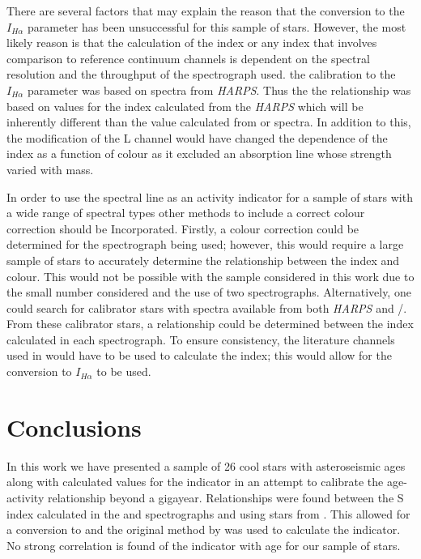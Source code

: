 There are several factors that may explain the reason that the conversion to the $I_{H\alpha}$ parameter has been unsuccessful for this sample of stars. However, the most likely reason is that the calculation of the \Halpha index or any index that involves comparison to reference continuum channels is dependent on the spectral resolution and the throughput of the spectrograph used. the calibration to the $I_{H\alpha}$ parameter was based on spectra from \textit{HARPS}. Thus the the relationship was based on values for the \Halpha index calculated from the \textit{HARPS} which will be inherently different than the value calculated from \esp or \narval spectra. In addition to this, the modification of the L channel would have changed the dependence of the \Halpha index as a function of colour as it excluded an absorption line whose strength varied with mass.

In order to use the \Halpha spectral line as an activity indicator for a sample of stars with a wide range of spectral types other methods to include a correct colour correction should be Incorporated. Firstly, a colour correction could be determined for the spectrograph being used; however, this would require a large sample of stars to accurately determine the relationship between the \Halpha index and colour. This would not be possible with the sample considered in this work due to the small number considered and the use of two spectrographs. Alternatively, one could search for calibrator stars with spectra available from both \textit{HARPS} and \esp/\narval. From these calibrator stars, a relationship could be determined between the \Halpha index calculated in each spectrograph. To ensure consistency, the literature channels used in \citet{Gomes_da_Silva_etal_2014} would have to be used to calculate the \Halpha index; this would allow for the conversion to $I_{H\alpha}$ to be used.

\section{Conclusions}
In this work we have presented a sample of 26 cool stars with asteroseismic ages along with calculated values for the \Rprime indicator in an attempt to calibrate the age-activity relationship beyond a gigayear. Relationships were found between the S index calculated in the \narval and \esp spectrographs and \Smw using stars from \citet{Duncan_etal_1991}. This allowed for a conversion to \Smw and the original method by \citet{Noyes_etal_1984} was used to calculate the \Rprime indicator. No strong correlation is found of the \Rprime indicator with age for our sample of stars.

